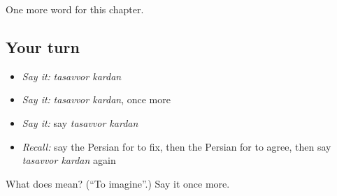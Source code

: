 \begin{grammarlens}[title={What you've built}]
One more word for this chapter.
\end{grammarlens}

\subsection*{Your turn}
\begin{itemize}
\raggedright
  \item \emph{Say it:} \emph{tasavvor kardan}
  \item \emph{Say it:} \emph{tasavvor kardan}, once more
  \item \emph{Say it:} say \emph{tasavvor kardan}
  \item \emph{Recall:} say the Persian for to fix, then the Persian for to agree, then say \emph{tasavvor kardan} again
\end{itemize}

\begin{tcolorbox}[breakable,colback=teal!4,colframe=teal!35!black,title={Before you move on}]
What does   mean? (\textquotedblleft{}To imagine\textquotedblright{}.) Say it once more.
\end{tcolorbox}
